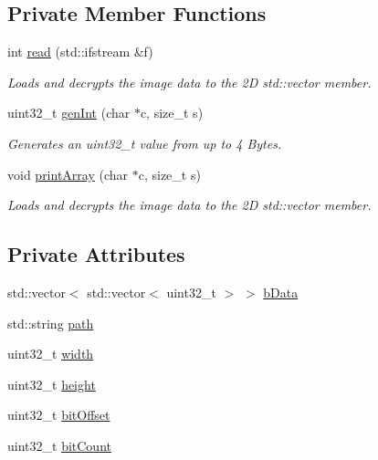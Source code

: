 \subsection*{Private Member Functions}
\begin{DoxyCompactItemize}
\item 
int \mbox{\hyperlink{classBitmapArray_a3a5834d03cd095769b422d4d66b9435f}{read}} (std\+::ifstream \&f)
\begin{DoxyCompactList}\small\item\em Loads and decrypts the image data to the 2D std\+::vector member. \end{DoxyCompactList}\item 
uint32\+\_\+t \mbox{\hyperlink{classBitmapArray_a158fbbaa026332a732f644a8c368a2f0}{gen\+Int}} (char $\ast$c, size\+\_\+t s)
\begin{DoxyCompactList}\small\item\em Generates an uint32\+\_\+t value from up to 4 Bytes. \end{DoxyCompactList}\item 
void \mbox{\hyperlink{classBitmapArray_a99a8a164e51e29407f24dab4752232c1}{print\+Array}} (char $\ast$c, size\+\_\+t s)
\begin{DoxyCompactList}\small\item\em Loads and decrypts the image data to the 2D std\+::vector member. \end{DoxyCompactList}\end{DoxyCompactItemize}
\subsection*{Private Attributes}
\begin{DoxyCompactItemize}
\item 
std\+::vector$<$ std\+::vector$<$ uint32\+\_\+t $>$ $>$ \mbox{\hyperlink{classBitmapArray_a4af158b9be17ce7ebeab8729c2b34ab2}{b\+Data}}
\item 
std\+::string \mbox{\hyperlink{classBitmapArray_a3a3e1fbdd198c6731c7f6e20fb492445}{path}}
\item 
uint32\+\_\+t \mbox{\hyperlink{classBitmapArray_a44f51b2c1ecde3f9aa504df25d65b6c9}{width}}
\item 
uint32\+\_\+t \mbox{\hyperlink{classBitmapArray_adb8d1a8fcc55c3884ad3eea71c6042be}{height}}
\item 
uint32\+\_\+t \mbox{\hyperlink{classBitmapArray_abcab200a1eb84331f7c79702e9199694}{bit\+Offset}}
\item 
uint32\+\_\+t \mbox{\hyperlink{classBitmapArray_a18127e27d4b1477fd46ef0c0b3dbc110}{bit\+Count}}
\end{DoxyCompactItemize}


